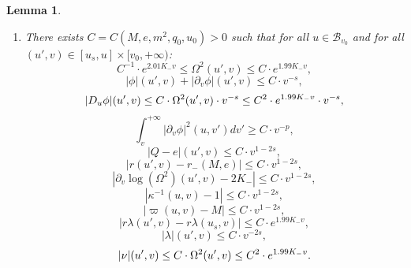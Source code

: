 \documentclass[10pt,a4paper]{article}
\theoremstyle{plain}
\newtheorem{lem}[thm]{Lemma}
\theoremstyle{remark}
\theoremstyle{definition}
\theoremstyle{plain}
\theoremstyle{remark}
\theoremstyle{definition}
\numberwithin{equation}{section}
\begin{document}
\begin{lem}
\begin{enumerate}
		\item \label{fourthlemma} There exists $C=C(M,e,m^2,q_0,u_0)>0$ such that for all $u\in  \mathcal{B}_{v_0}$ and for all $(u',v) \in [u_s,u] \times [v_0,+\infty)$: \begin{equation}\label{B1'}
		C^{-1} \cdot 	e^{2.01 K_- v} \leq 	\Omega^2(u',v) \leq  C \cdot e^{1.99K_- v}, 	\end{equation}  \begin{equation} \label{B2'}
		|\phi|(u',v)+	|\partial_v \phi|(u',v) \leq  C \cdot v^{-s},
		\end{equation}  \begin{equation} \label{B2.5'}
		|D_u \phi|(u',v)\leq  C \cdot \Omega^2(u',v) \cdot v^{-s}  \leq \color{black}  C^2 \cdot e^{1.99K_- v} \cdot v^{-s},
		\end{equation}  	\begin{equation} \label{B.275'}
		\int_{v}^{+\infty} |\partial_v \phi|^2(u,v') dv' \geq  C \cdot v^{-p},			\end{equation}\begin{equation} \label{B3'}
		|Q-e|(u',v) \leq  C \cdot v^{1-2s},
		\end{equation}\begin{equation} \label{B4'}
		|r(u',v)-r_-(M,e)| \leq  C \cdot v^{1-2s},
		\end{equation}
		\begin{equation} \label{B5'}
		|\partial_v \log(\Omega^2)(u',v)-2K_-|\leq  C \cdot v^{1-2s},
		\end{equation}  	\begin{equation} \label{B6'}
		|\kappa^{-1}(u,v)-1| \leq  C \cdot v^{1-2s},
		\end{equation} \begin{equation} \label{B7'}
		|\varpi(u,v)-M| \leq  C \cdot v^{1-2s},
		\end{equation}
		\begin{equation} \label{lambda}
		|r\lambda(u',v)-r\lambda(u_s,v)| \leq  C \cdot e^{1.99K_- v},	\end{equation}
		\begin{equation} \label{lambda2}
		|\lambda|(u',v) \leq  C \cdot v^{-2s},	\end{equation}
		\begin{equation} \label{nu2}
		|\nu|(u',v)\leq  C \cdot \Omega^2(u',v) \leq \color{black} C^2 \cdot e^{1.99K_- v}. 			\end{equation}
		
		
	\end{enumerate}
	
\end{lem}
\end{document}
